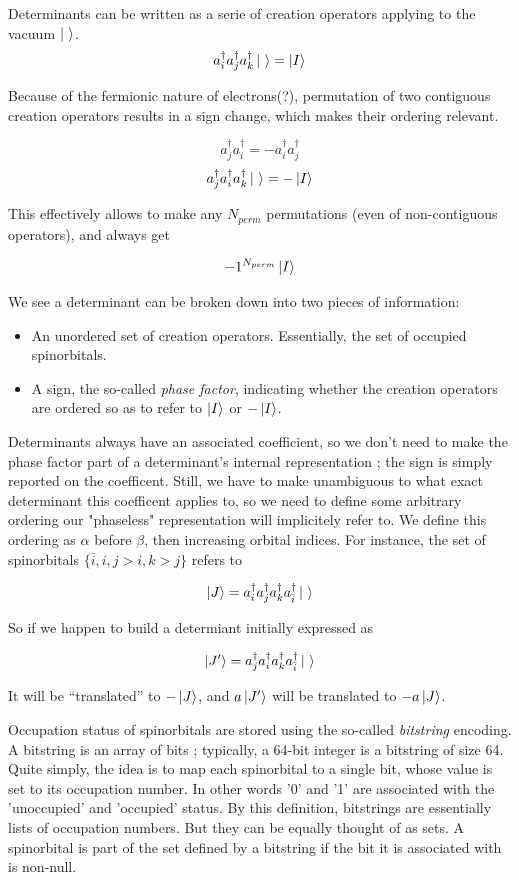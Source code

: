 Determinants can be written as a serie of creation operators applying to the vacuum $\ket \ $.
$$a^\dagger_i a^\dagger_j a^\dagger_k \ket \  = \ket I$$

Because of the fermionic nature of electrons(?), permutation of two contiguous creation operators results in a sign change, which makes their ordering relevant.

$$a^\dagger_j a^\dagger_i = -a^\dagger_i a^\dagger_j$$
$$a^\dagger_j a^\dagger_i a^\dagger_k \ket \  = -\ket I$$

This effectively allows to make any $N_{perm}$ permutations (even of non-contiguous operators), and always get

$$-1^{N_{perm}} \ket I$$


We see a determinant can be broken down into two pieces of information:
\begin{itemize}
\item
An unordered set of creation operators. Essentially, the set of occupied spinorbitals.
\item
A sign, the so-called \emph{phase factor}, indicating whether the creation operators are ordered so as to refer to $\ket I$ or $-\ket I$.
\end{itemize}

Determinants always have an associated coefficient, so we don't need to make the phase factor part of a determinant's internal representation ; the sign is simply reported on the coefficent. Still, we have to make unambiguous to what exact determinant this coefficent applies to, so we need to define some arbitrary ordering our "phaseless" representation will implicitely refer to. We define this ordering as $\alpha$ before $\beta$, then increasing orbital indices.
For instance, the set of spinorbitals $\{\bar i, i,j>i,k>j\}$ refers to

$$\ket J = a^\dagger_i a^\dagger_j a^\dagger_k a^\dagger_{\bar i} \ket \ $$

So if we happen to build a determiant initially expressed as

$$\ket {J'} = a^\dagger_j a^\dagger_i a^\dagger_k a^\dagger_{\bar i} \ket \ $$

It will be ``translated'' to $-\ket J$, and $a\ket {J'}$ will be translated to $-a\ket J$.


Occupation status of spinorbitals are stored using the so-called \emph{bitstring} encoding. A bitstring is an array of bits ; typically, a 64-bit integer is a bitstring of size 64.
Quite simply, the idea is to map each spinorbital to a single bit, whose value is set to its occupation number. In other words '0' and '1' are associated with the 'unoccupied' and 'occupied' status.
By this definition, bitstrings are essentially lists of occupation numbers. But they can be equally thought of as sets. A spinorbital is part of the set defined by a bitstring if the bit it is associated with is non-null.


